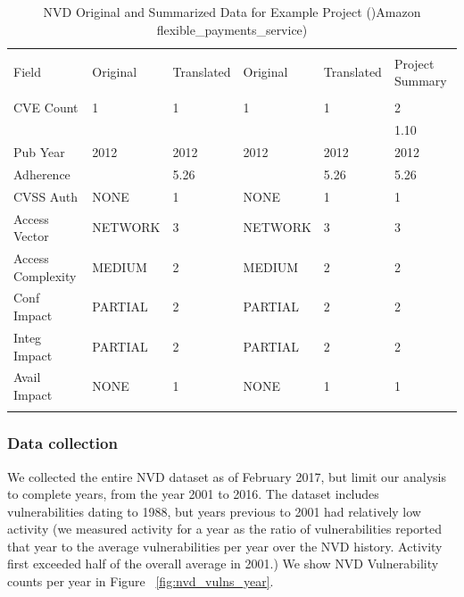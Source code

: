 \begin{table}
	\begin{center}	
		\caption{NVD Original and Summarized Data for Example Project ()Amazon flexible\_payments\_service)}
		\label{tab:nvd_data_examples}
		\begin{scriptsize}
			\begin{tabular}{p{3cm}p{1.5cm}p{1cm}p{1.5cm}p{1cm}p{1cm}}
				&&&&&\\[-1.8ex]\hline 
				\hline &&&&\\[-1.8ex] 
				Field & Original & Translated & Original & Translated & Project Summary \\
				\hline &&&&&\\[-1.8ex] 				
				CVE Count &  1 & 1 & 1 & 1 & 2\\
				&&&&& 1.10\\
				Pub Year & 2012 & 2012 & 2012 & 2012 & 2012\\
				Adherence & & 5.26 & & 5.26 & 5.26 \\				
				CVSS Auth & NONE & 1 & NONE & 1 & 1 \\
				Access Vector & NETWORK & 3 & NETWORK & 3 & 3 \\
				Access Complexity & MEDIUM & 2 & MEDIUM & 2 & 2 \\
				Conf Impact & PARTIAL & 2 & PARTIAL & 2 & 2\\
				Integ Impact & PARTIAL & 2 & PARTIAL & 2 & 2\\
				Avail Impact & NONE & 1 & NONE & 1 & 1 \\
				\hline &&&&&\\[-1.8ex] 		
			\end{tabular}
		\end{scriptsize}
	\end{center}
\end{table}
			
			
\subsubsection{Data collection}
We collected the entire NVD dataset as of February 2017, but limit our analysis to complete years, from the year 2001 to 2016. The dataset includes vulnerabilities dating to 1988, but years previous to 2001 had relatively low activity (we measured activity for a year as the ratio of vulnerabilities reported that year to the average vulnerabilities per year over the NVD history. Activity first exceeded half of the overall average in 2001.) We show NVD Vulnerability counts per year in Figure ~\ref{fig:nvd_vulns_year}.

